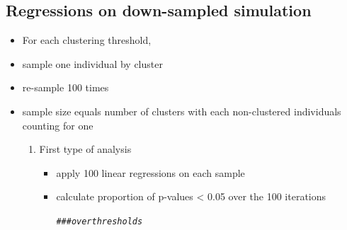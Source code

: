 \documentclass[]{revtex4}\usepackage[]{graphicx}\usepackage[]{color}
\makeatletter
\newcommand{\hlcom}[1]{\textcolor[rgb]{0.678,0.584,0.686}{\textit{#1}}}%
\newenvironment{kframe}{%
 \def\at@end@of@kframe{}%
 \ifinner\ifhmode%
  \def\at@end@of@kframe{\end{minipage}}%
  \begin{minipage}{\columnwidth}%
 \fi\fi%
 \def\FrameCommand##1{\hskip\@totalleftmargin \hskip-\fboxsep
 \colorbox{shadecolor}{##1}\hskip-\fboxsep
     \hskip-\linewidth \hskip-\@totalleftmargin \hskip\columnwidth}%
 \MakeFramed {\advance\hsize-\width
   \@totalleftmargin\z@ \linewidth\hsize
   \@setminipage}}%
 {\par\unskip\endMakeFramed%
 \at@end@of@kframe}
\newenvironment{knitrout}{}{} %
\makeatother
\begin{document}
\subsection{Regressions on down-sampled simulation}

\begin{itemize}
  \item For each clustering threshold, 
  \item sample one individual by cluster
  \item re-sample 100 times
  \item sample size equals number of clusters with each non-clustered individuals counting for one
    \begin{enumerate}
    \item First type of analysis
      \begin{itemize}
      \item apply 100 linear regressions on each sample
      \item calculate proportion of p-values < 0.05 over the 100 iterations
      
    



\begin{knitrout}
\color{fgcolor}\begin{kframe}
\begin{alltt}
\hlcom{### over thresholds}


\end{alltt}
\end{kframe}
\end{knitrout}
\end{itemize}
\end{enumerate}
\end{itemize}
\end{document}
